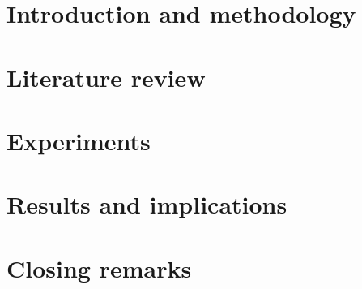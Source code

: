 \documentclass[english]{his-thesis}
\begin{document}
\tableofcontents
\listoffigures
\listoftables


\cleardoublepage
{}%
\setcounter{page}{1}%
\pagestyle{headings}

\part{Introduction and methodology}


\part{Literature review}

\part{Experiments}


\part{Results and implications}




\part{Closing remarks}


%


\listofreferences

\dissertationlist
\end{document}

